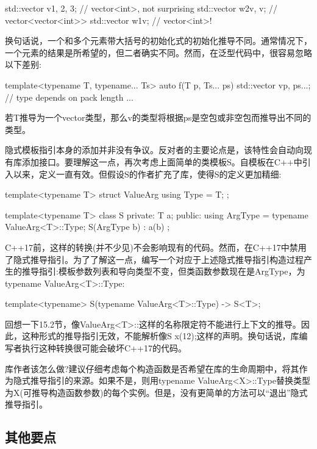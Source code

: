 \begin{cpp}
std::vector v{1, 2, 3}; // vector<int>, not surprising
std::vector w2{v, v}; // vector<vector<int>>
std::vector w1{v}; // vector<int>!
\end{cpp}

换句话说，一个和多个元素带大括号的初始化式的初始化推导不同。通常情况下，一个元素的结果是所希望的，但二者确实不同。然而，在泛型代码中，很容易忽略以下差别:

\begin{cpp}
template<typename T, typename... Ts>
auto f(T p, Ts... ps) {
	std::vector v{p, ps...}; // type depends on pack length
	...
}
\end{cpp}

若T推导为一个vector类型，那么v的类型将根据ps是空包或非空包而推导出不同的类型。

隐式模板指引本身的添加并非没有争议。反对者的主要论点是，该特性会自动向现有库添加接口。要理解这一点，再次考虑上面简单的类模板S。自模板在C++中引入以来，定义一直有效。但假设S的作者扩充了库，使得S的定义更加精细:

\begin{cpp}
template<typename T>
struct ValueArg {
	using Type = T;
};

template<typename T>
class S {
	private:
	T a;
	public:
	using ArgType = typename ValueArg<T>::Type;
	S(ArgType b) : a(b) {
	}
};
\end{cpp}

C++17前，这样的转换(并不少见)不会影响现有的代码。然而，在C++17中禁用了隐式推导指引。为了了解这一点，编写一个对应于上述隐式推导指引构造过程产生的推导指引:模板参数列表和导向类型不变，但类函数参数现在是ArgType，为typename ValueArg<T>::Type:

\begin{cpp}
template<typename> S(typename ValueArg<T>::Type) -> S<T>;
\end{cpp}

回想一下15.2节，像ValueArg<T>::这样的名称限定符不能进行上下文的推导。因此，这种形式的推导指引无效，不能解析像S x(12);这样的声明。换句话说，库编写者执行这种转换很可能会破坏C++17的代码。

库作者该怎么做?建议仔细考虑每个构造函数是否希望在库的生命周期中，将其作为隐式推导指引的来源。如果不是，则用typename ValueArg<X>::Type替换类型为X(可推导构造函数参数)的每个实例。但是，没有更简单的方法可以“退出”隐式推导指引。

\subsection{其他要点}

